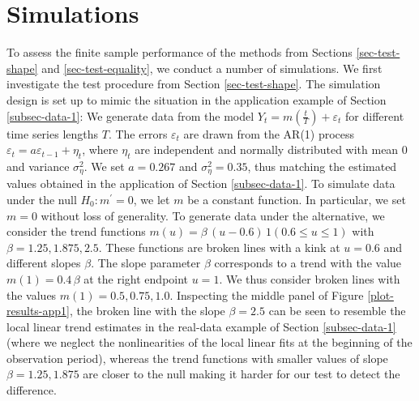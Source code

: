 
\section{Simulations}\label{sec-sim}


To assess the finite sample performance of the methods from Sections \ref{sec-test-shape} and \ref{sec-test-equality}, we conduct a number of simulations. We first investigate the test procedure from Section \ref{sec-test-shape}. The simulation design is set up to mimic the situation in the application example of Section \ref{subsec-data-1}: We generate data from the model $Y_t = m(\frac{t}{T}) + \varepsilon_t$ for different time series lengths $T$. The errors $\varepsilon_t$ are drawn from the AR(1) process $\varepsilon_t = a \varepsilon_{t-1} + \eta_t$, where $\eta_t$ are independent and normally distributed with mean $0$ and variance $\sigma_\eta^2$. We set $a = 0.267$ and $\sigma_\eta^2 = 0.35$, thus matching the estimated values obtained in the application of Section \ref{subsec-data-1}. To simulate data under the null $H_0: m^\prime = 0$, we let $m$ be a constant function. In particular, we set $m = 0$ without loss of generality. To generate data under the alternative, we consider the trend functions $m(u) = \beta \, (u - 0.6) \, 1(0.6 \le u \le 1)$ with $\beta = 1.25, 1.875, 2.5$. These functions are broken lines with a kink at $u = 0.6$ and different slopes $\beta$. The slope parameter $\beta$ corresponds to a trend with the value $m(1) = 0.4 \, \beta$ at the right endpoint $u = 1$. We thus consider broken lines with the values $m(1) = 0.5, 0.75, 1.0$. Inspecting the middle panel of Figure \ref{plot-results-app1}, the broken line with the slope $\beta = 2.5$ can be seen to resemble the local linear trend estimates in the real-data example of Section \ref{subsec-data-1} (where we neglect the nonlinearities of the local linear fits at the beginning of the observation period), whereas the trend functions with smaller values of slope $\beta = 1.25, 1.875$ are closer to the null making it harder for our test to detect the difference.


